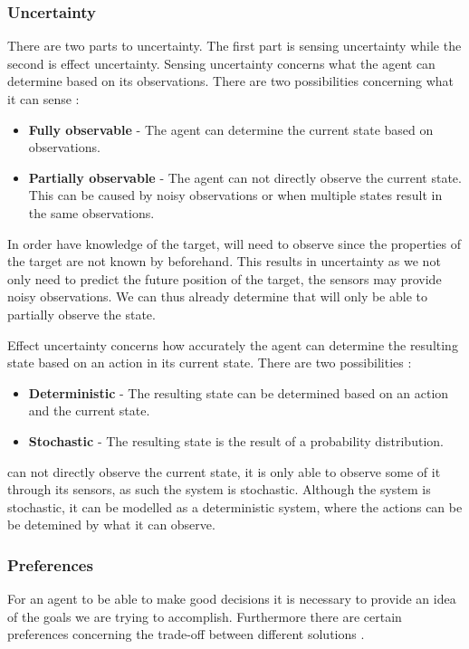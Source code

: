 \subsubsection{Uncertainty}

There are two parts to uncertainty. The first part is sensing uncertainty while
the second is effect uncertainty. Sensing uncertainty concerns what the agent
can determine based on its observations. There are two possibilities concerning
what it can sense \citep[Ch. 1.5.4]{MIBook}:
\begin{itemize}
  \item \textbf{Fully observable} - The agent can determine the current state
  based on observations.
  \item \textbf{Partially observable} - The agent can not directly observe the
  current state. This can be caused by noisy observations or when multiple
  states result in the same observations.
\end{itemize}

In order have knowledge of the target, \name will need to observe since the
properties of the target are not known by \name beforehand. This results in
uncertainty as we not only need to predict the future position of the target,
the sensors may provide noisy observations. We can thus already determine that
\name will only be able to partially observe the state.\nl

Effect uncertainty concerns how accurately the agent can determine the resulting
state based on an action in its current state. There are two possibilities
\citep[Ch. 1.5.4]{MIBook}:
\begin{itemize}
  \item \textbf{Deterministic} - The resulting state can be determined based on
  an action and the current state.
  \item \textbf{Stochastic} - The resulting state is the result of a probability
  distribution.
\end{itemize}

\name can not directly observe the current state, it is only able
to observe some of it through its sensors, as such the system is stochastic.
Although the system is stochastic, it can be modelled as a deterministic system, where
the actions can be be detemined by what it can observe.
 
\subsubsection{Preferences}
For an agent to be able to make good decisions it is necessary to provide an
idea of the goals we are trying to accomplish. Furthermore there are certain
preferences concerning the trade-off between different solutions \citep[Ch.
1.5.5]{MIBook}.

